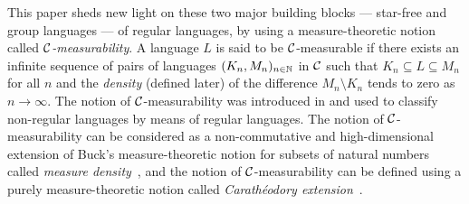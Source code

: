 This paper sheds new light on these two major building blocks --- star-free and group languages --- of regular languages, by using a measure-theoretic notion called \emph{\({\cal C}\)-measurability}.
A language \(L\) is said to be \({\cal C}\)-measurable if there exists an infinite sequence of pairs of languages \((K_n, M_n)_{n \in \mathbb{N}}\) in \({\cal C}\) such that \(K_n \subseteq L \subseteq M_n\) for all \(n\) and the \emph{density} (defined later) of the difference \(M_n \setminus K_n\) tends to zero as \(n \to \infty\).
The notion of \({\cal C}\)-measurability was introduced in \cite{S2021} and used to classify non-regular languages by means of regular languages.
The notion of \({\cal C}\)-measurability can be considered as a non-commutative and high-dimensional extension of Buck's measure-theoretic notion for subsets of natural numbers called \emph{measure density}~\cite{Buck}, and the notion of \({\cal C}\)-measurability can be defined using a purely measure-theoretic notion called \emph{Carath{\'e}odory extension}~\cite{carathe}.
